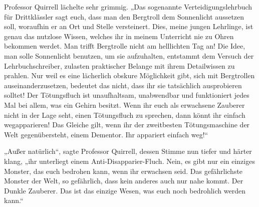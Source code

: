 Professor Quirrell lächelte sehr grimmig. „Das sogenannte Verteidigungslehrbuch für Drittklässler sagt euch, dass man den Bergtroll dem Sonnenlicht aussetzen soll, woraufhin er an Ort und Stelle versteinert. Dies, meine jungen Lehrlinge, ist genau das nutzlose Wissen, welches ihr in meinem Unterricht nie zu Ohren bekommen werdet. Man trifft Bergtrolle nicht am helllichten Tag an! Die Idee, man solle Sonnenlicht benutzen, um sie aufzuhalten, entstammt dem Versuch der Lehrbuchschreiber, zulasten praktischer Belange mit ihrem Detailwissen zu prahlen. Nur weil es eine lächerlich obskure Möglichkeit gibt, sich mit Bergtrollen auseinanderzusetzen, bedeutet das nicht, dass ihr sie tatsächlich ausprobieren solltet! Der Tötungsfluch ist unaufhaltsam, unabwendbar und funktioniert jedes Mal bei allem, was ein Gehirn besitzt. Wenn ihr euch als erwachsene Zauberer nicht in der Lage seht, einen Tötungsfluch zu sprechen, dann könnt ihr einfach wegapparieren! Das Gleiche gilt, wenn ihr der zweitbesten Tötungsmaschine der Welt gegenübersteht, einem Dementor. Ihr appariert einfach weg!“

„Außer natürlich“, sagte Professor Quirrell, dessen Stimme nun tiefer und härter klang, „ihr unterliegt einem Anti-Disapparier-Fluch. Nein, es gibt nur ein einziges Monster, das euch bedrohen kann, wenn ihr erwachsen seid. Das gefährlichste Monster der Welt, so gefährlich, dass kein anderes auch nur nahe kommt. Der Dunkle Zauberer. Das ist das einzige Wesen, was euch noch bedrohlich werden kann.“

